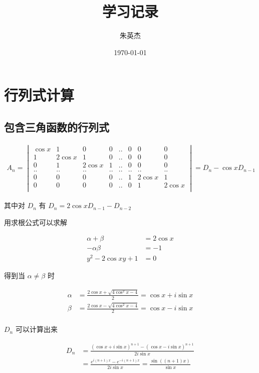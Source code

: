 \documentclass[12pt,a4paper]{ctexart}
\title{学习记录}
\author{朱英杰}
\date{\today}
\begin{document}
\maketitle
\tableofcontents

\section{行列式计算}

\subsection{包含三角函数的行列式}

\begin{align*}
    A_n = \begin{vmatrix}
        \cos x & 1 & 0 & 0 & .. & 0 & 0 & 0 \\
        1 & 2\cos x & 1 & 0 & .. & 0 & 0 & 0 \\
        0 & 1 & 2 \cos x & 1 &  .. & 0 & 0 & 0\\
        .. & .. &.. &.. &.. &.. &.. & .. \\
        0 & 0 & 0  & 0 &  .. & 1 & 2 \cos x & 1\\
        0 & 0 & 0  & 0 &  .. & 0 & 1 & 2 \cos x\\
    \end{vmatrix} =  D_n - \cos x D_{n-1}
\end{align*}

其中对 $D_n$ 有 $D_n = 2 \cos x D_{n-1} - D_{n-2}$

用求根公式可以求解

\begin{align*}
\alpha + \beta &= 2 \cos x \\
-\alpha \beta &= -1 \\
y^2 - 2 \cos x y + 1 & = 0 
\end{align*}

得到当 $\alpha \ne \beta$ 时

\begin{align*}
\alpha &= \frac{2 \cos x + \sqrt{4 \cos^2 x - 4}}{2} = \cos x + i \sin x \\
\beta &= \frac{2 \cos x - \sqrt{4 \cos^2 x - 4}}{2} = \cos x - i \sin x \\
\end{align*}

$D_n$ 可以计算出来

\begin{align*}
    D_n &= \frac{ (\cos x + i \sin x)^{n+1} - (\cos x - i \sin x)^{n+1} }{2 i \sin x} \\
    &= \frac{e^{i(n+1)x}  - e^{-i(n+1)x}}{2 i \sin x} = \frac{\sin ((n+1)x)}{ \sin x}
\end{align*}
\end{document}
